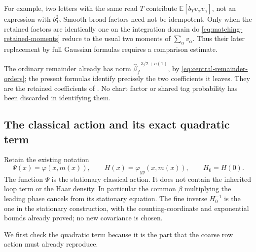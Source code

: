 \documentclass[11pt,reqno]{amsart}
\numberwithin{equation}{section}
\theoremstyle{definition}
\theoremstyle{remark}
\begin{document}
For example, two letters with the same read \(T\) contribute
\(\mathbb E[b_Tv_\alpha v_\gamma]\), not an expression with
\(b_T^2\). Smooth broad factors need not be idempotent.
Only when the retained factors are identically one on the
integration domain do \eqref{eq:matching-retained-moments}
reduce to the usual two moments of
\(\sum_\alpha v_\alpha\).
Thus their later replacement by full Gaussian formulas
requires a comparison estimate.

The ordinary remainder already has norm
\(\widehat\beta_f^{-3/2+o(1)}\), by
\eqref{eq:central-remainder-orders}; the present formulas
identify precisely the two coefficients it leaves.
They are the retained coefficients of
\cite[Lemma~36.1, p.~228]{Main}.
No chart factor or shared tag probability has been
discarded in identifying them.

\subsection{The classical action and its exact quadratic term}

Retain the existing notation
\[
 \Psi(x)=\varphi(x,m(x)),\qquad
 H(x)=\varphi_{yy}(x,m(x)),\qquad
                            H_0=H(0).
\]
The function \(\Psi\) is the stationary classical action.
It does not contain the inherited loop term or the Haar
density. In particular the common \(\beta\) multiplying
the leading phase cancels from its stationary equation.
The fine inverse \(H_0^{-1}\) is the one in the stationary
construction, with the counting-coordinate and exponential
bounds already proved; no new covariance is chosen.

We first check the quadratic term because it is the part
that the coarse row action must already reproduce.
\end{document}
